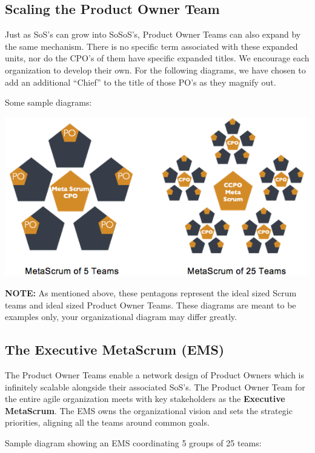 \documentclass[12pt,a4paper,parskip=full]{scrartcl}
\begin{document}
\subsection{Scaling the Product Owner Team}
Just as SoS's can grow into SoSoS's, Product Owner Teams can also expand by the same
mechanism. There is no specific term associated with these expanded units,
nor do the CPO's of them have specific expanded titles. We encourage each
organization to develop their own. For the following diagrams, we have
chosen to add an additional ``Chief'' to the title of those PO's as they
magnify out.

Some sample diagrams:

\includegraphics[width=1.0\linewidth]{MetaScrum-R2.png}

\textbf{NOTE:} As mentioned above, these pentagons represent the ideal
sized Scrum teams and ideal sized Product Owner Teams. These diagrams are meant to
be examples only, your organizational diagram may differ greatly.

\subsection{The Executive MetaScrum (EMS)}
The Product Owner Teams enable a network design of Product Owners which is
infinitely scalable alongside their associated SoS's. The Product Owner Team for the
entire agile organization meets with key stakeholders as the \textbf{Executive MetaScrum}. The EMS owns
the organizational vision and sets the strategic priorities, aligning all the teams around common goals.

Sample diagram showing an EMS coordinating 5 groups of 25 teams:
\end{document}
